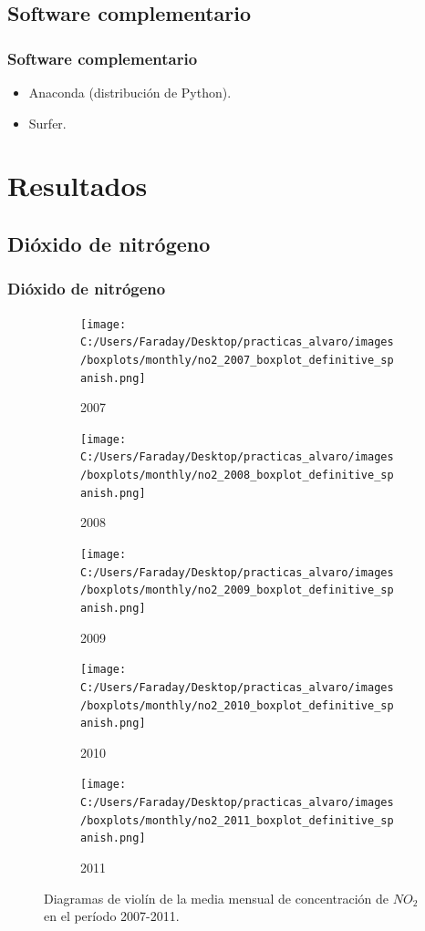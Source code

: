 \documentclass[12pt]{beamer}
\begin{document}
\subsection{Software complementario}
\begin{frame}
\frametitle{Software complementario}
\begin{itemize}
\item<1-> Anaconda (distribución de Python).
\item<2-> Surfer.
\end{itemize}
\end{frame}

\section{Resultados}
\subsection{Dióxido de nitrógeno}
\begin{frame}[squeeze]
\frametitle{Dióxido de nitrógeno}
\begin{figure}[H]
\centering
\begin{subfigure}[H]{0.32\textwidth}
\texttt{[image: C:/Users/Faraday/Desktop/practicas\_alvaro/images/boxplots/monthly/no2\_2007\_boxplot\_definitive\_spanish.png]}
\captionsetup{labelformat=empty}
\caption{\scriptsize 2007}
\label{fig:box-no2-2007}
\end{subfigure}
%
\begin{subfigure}[H]{0.32\textwidth}
\texttt{[image: C:/Users/Faraday/Desktop/practicas\_alvaro/images/boxplots/monthly/no2\_2008\_boxplot\_definitive\_spanish.png]}
\captionsetup{labelformat=empty}
\caption{\scriptsize 2008}
\label{fig:box-no2-2008}
\end{subfigure}
%
\begin{subfigure}[H]{0.32\textwidth}
\texttt{[image: C:/Users/Faraday/Desktop/practicas\_alvaro/images/boxplots/monthly/no2\_2009\_boxplot\_definitive\_spanish.png]}
\captionsetup{labelformat=empty}
\caption{\scriptsize 2009}
\label{fig:box-no2-2009}
\end{subfigure}

\begin{subfigure}[H]{0.32\textwidth}
\texttt{[image: C:/Users/Faraday/Desktop/practicas\_alvaro/images/boxplots/monthly/no2\_2010\_boxplot\_definitive\_spanish.png]}
\captionsetup{labelformat=empty}
\caption{\scriptsize 2010}
\label{fig:box-no2-2010}
\end{subfigure}
%
\begin{subfigure}[H]{0.32\textwidth}
\texttt{[image: C:/Users/Faraday/Desktop/practicas\_alvaro/images/boxplots/monthly/no2\_2011\_boxplot\_definitive\_spanish.png]}
\captionsetup{labelformat=empty}
\caption{\scriptsize 2011}
\label{fig:box-no2-2011}
\end{subfigure}
\caption{\scriptsize Diagramas de violín de la media mensual de concentración de $NO_{2}$ en el período 2007-2011.}
\label{fig:box-no2-monthly}
\end{figure}
\end{frame}
\end{document}
